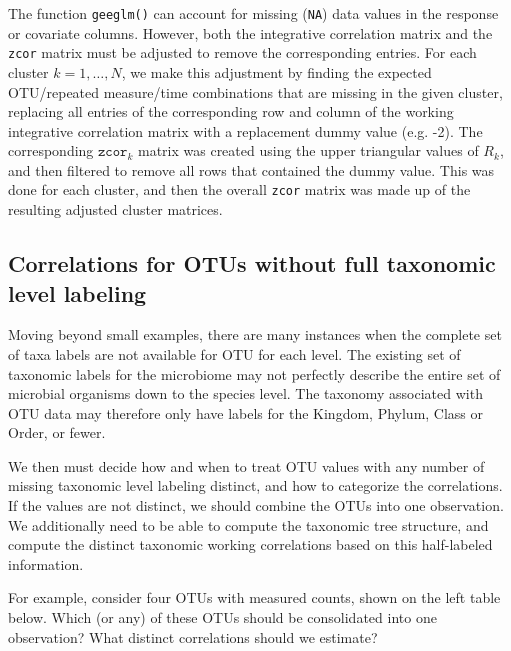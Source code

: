 \documentclass[12pt]{article}
\begin{document}
The function \texttt{geeglm()} can account for missing (\texttt{NA}) data values in the response or covariate columns. However, both the integrative correlation matrix and the \texttt{zcor} matrix must be adjusted to remove the corresponding entries. For each cluster $k = 1, \ldots , N$, we make this adjustment by finding the expected OTU/repeated measure/time combinations that are missing in the given cluster, replacing all entries of the corresponding row and column of the working integrative correlation matrix with a replacement dummy value (e.g. -2). The corresponding $\texttt{zcor}_k$ matrix was created using the upper triangular values of $R_k$, and then filtered to remove all rows that contained the dummy value. This was done for each cluster, and then the overall \texttt{zcor} matrix was made up of the resulting adjusted cluster matrices.


\subsection{Correlations for OTUs without full taxonomic level labeling}

Moving beyond small examples, there are many instances when the complete set of taxa labels are not available for OTU for each level. The existing set of taxonomic labels for the microbiome may not perfectly describe the entire set of microbial organisms down to the species level. The taxonomy associated with OTU data may therefore only have labels for the Kingdom, Phylum, Class or Order, or fewer.

We then must decide how and when to treat OTU values with any number of missing taxonomic level labeling distinct, and how to categorize the correlations. If the values are not distinct, we should combine the OTUs into one observation. We additionally need to be able to compute the taxonomic tree structure, and compute the distinct taxonomic working correlations based on this half-labeled information.

For example, consider four OTUs with measured counts, shown on the left table below. Which (or any) of these OTUs should be consolidated into one observation? What distinct correlations should we estimate?
\end{document}
